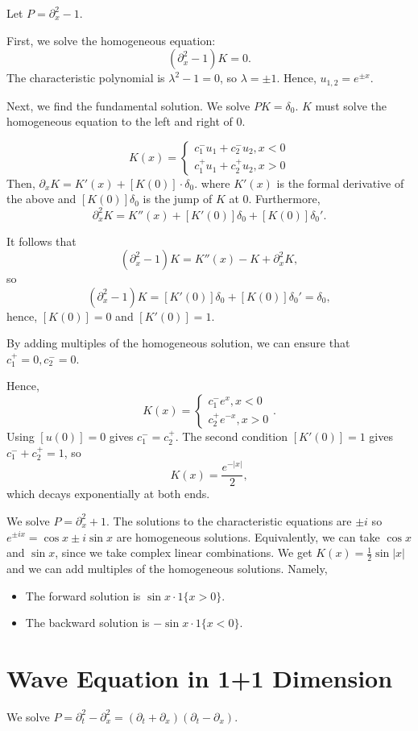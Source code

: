 \documentclass[12pt]{scrartcl}
\begin{document}
\begin{example} Let $P = \partial_x^2 - 1$.  

First, we solve the homogeneous equation: $$(\partial_x^2 - 1)K = 0.$$
The characteristic polynomial is $\lambda^2 - 1= 0$, so $\lambda = \pm 1$.  Hence, $u_{1,2} = e^{\pm x}.$

Next, we find the fundamental solution.  We solve $PK = \delta_0$.  $K$ must solve the homogeneous equation to the left and right of $0$.

$$K(x) = \begin{cases} c_1^{-}u_1 + c_2^{-}u_2, x < 0\\ c_1^{+}u_1 + c_2^{+}u_2, x > 0 \end{cases}$$
Then, $\partial_x K = K'(x) + [K(0)]\cdot \delta_0$. where $K'(x)$ is the formal derivative of the above and $[K(0)]\delta_0$ is the jump of $K$ at $0$.  Furthermore,
$$\partial_x^2 K = K''(x) + [K'(0)]\delta_0 + [K(0)]\delta_0'.$$

It follows that 
$$(\partial_x^2 - 1)K = K''(x) - K + \partial_x^2 K,$$
so $$(\partial_x^2 - 1)K = [K'(0)]\delta_0 + [K(0)]\delta_0' = \delta_0,$$
hence, $[K(0)] = 0$ and $[K'(0)] = 1$.

By adding multiples of the homogeneous solution, we can ensure that $c_1^+ = 0, c_2^- = 0$.  

Hence,
$$K(x) = \begin{cases} c_1^{-}e^{x},  x < 0 \\ c_2^{+}e^{-x}, x > 0\end{cases}.$$
Using $[u(0)] = 0$ gives $c_1^{-} = c_2^+$.  The second condition $[K'(0)] = 1$ gives $c_1^{-} + c_2^+ = 1$, so $$K(x) = \frac{e^{-|x|}}{2},$$
which decays exponentially at both ends.
\end{example}
\begin{example} We solve $P = \partial_x^2 + 1$.  The solutions to the characteristic equations are $\pm i$ so $ e^{\pm ix} = \cos x \pm i \sin x$ are homogeneous solutions.  Equivalently, we can take $\cos x$ and $\sin x$, since we take complex linear combinations.  We get $K(x) = \frac{1}{2} \sin |x|$ and we can add multiples of the homogeneous solutions.  Namely,
\begin{itemize}
\item The forward solution is $\sin x \cdot 1\{x > 0\}$.
\item The backward solution is $-\sin x \cdot 1\{x < 0\}.$
\end{itemize}
\end{example}
\section{Wave Equation in 1+1 Dimension} We solve $P = \partial_t^2 - \partial_x^2 = (\partial_t + \partial_x) (\partial_t - \partial_x).$
\end{document}
